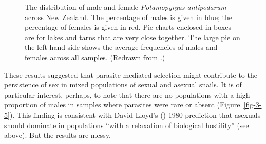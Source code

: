 \documentclass[
  letterpaper,
]{book}
\begin{document}
\begin{figure}


\caption[Distribution of male and female \emph{Potamopyrgus antipodarum}
across New Zealand]{\label{fig-3-6}The distribution of male and female
\emph{Potamopyrgus antipodarum} across New Zealand. The percentage of
males is given in blue; the percentage of females is given in red. Pie
charts enclosed in boxes are for lakes and tarns that are very close
together. The large pie on the left-hand side shows the average
frequencies of males and females across all samples. (Redrawn from
.)}

\end{figure}%

These results suggested that parasite-mediated selection might
contribute to the persistence of sex in mixed populations of sexual and
asexual snails. It is of particular interest, perhaps, to note that
there are no populations with a high proportion of males in samples
where parasites were rare or absent (Figure~\ref{fig-3-5}). This finding
is consistent with David Lloyd's () 1980
prediction that asexuals should dominate in populations ``with a
relaxation of biological hostility'' (see above). But the results are
messy.
\end{document}
